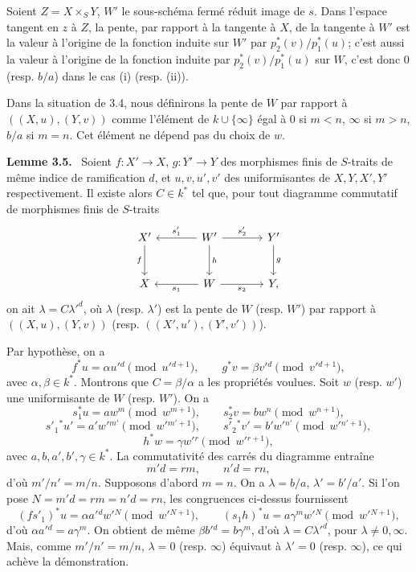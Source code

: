 \documentclass[11pt]{article}
\newenvironment{statement}[1]{\par\medskip\noindent\textbf{#1.}\ }{\par\medskip}
\begin{document}
Soient $Z=X\times_SY$, $W'$ le sous-schéma fermé réduit image de $s$. Dans l'espace tangent en $z$ à $Z$, la pente, par rapport à la tangente à $X$, de la tangente à $W'$ est la valeur à l'origine de la fonction induite sur $W'$ par $p_2^*(v)/p_1^*(u)$; c'est aussi la valeur à l'origine de la fonction induite par $p_2^*(v)/p_1^*(u)$ sur $W$, c'est donc $0$ (resp. $b/a$) dans le cas (i) (resp. (ii)).

Dans la situation de 3.4, nous définirons la pente de $W$ par rapport à $((X,u),(Y,v))$ comme l'élément de $k\cup\{\infty\}$ égal à $0$ si $m<n$, $\infty$ si $m>n$, $b/a$ si $m=n$. Cet élément ne dépend pas du choix de $w$.

\begin{statement}{Lemme 3.5}
Soient $f:X'\to X$, $g:Y'\to Y$ des morphismes finis de $S$-traits de même indice de ramification $d$, et $u,v,u',v'$ des uniformisantes de $X,Y,X',Y'$ respectivement. Il existe alors $C\in k^*$ tel que, pour tout diagramme commutatif de morphismes finis de $S$-traits
\[
\begin{tikzcd}[column sep=large,row sep=large]
X' \arrow[d,"f"'] & W' \arrow[l,"s'_1"'] \arrow[r,"s'_2"] \arrow[d,"h"] & Y' \arrow[d,"g"]\\
X & W \arrow[l,"s_1"] \arrow[r,"s_2"'] & Y ,
\end{tikzcd}
\]
on ait $\lambda=C{\lambda'}^d$, où $\lambda$ (resp. $\lambda'$) est la pente de $W$ (resp. $W'$) par rapport à $((X,u),(Y,v))$ (resp. $((X',u'),(Y',v'))$).
\end{statement}

Par hypothèse, on a
\[
f^*u=\alpha u'{}^d\pmod {u'{}^{d+1}},\qquad
g^*v=\beta v'{}^d\pmod {v'{}^{d+1}},
\]
avec $\alpha,\beta\in k^*$. Montrons que $C=\beta/\alpha$ a les propriétés voulues. Soit $w$ (resp. $w'$) une uniformisante de $W$ (resp. $W'$). On a
\[
s_1^*u=aw^m\pmod {w^{m+1}},\qquad
s_2^*v=bw^n\pmod {w^{n+1}},
\]
\[
s'_1{}^*u'=a'w'{}^{m'}\pmod {w'{}^{m'+1}},\qquad
s'_2{}^*v'=b'w'{}^{n'}\pmod {w'{}^{n'+1}},
\]
\[
h^*w=\gamma w'{}^r\pmod {w'{}^{r+1}},
\]
avec $a,b,a',b',\gamma\in k^*$. La commutativité des carrés du diagramme entraîne
\[
m'd=rm,\qquad n'd=rn,
\]
d'où $m'/n'=m/n$. Supposons d'abord $m=n$. On a $\lambda=b/a$, $\lambda'=b'/a'$. Si l'on pose $N=m'd=rm=n'd=rn$, les congruences ci-dessus fournissent
\[
(fs'_1)^*u=\alpha a'{}^d w'{}^N\pmod {w'{}^{N+1}},\qquad
(s_1h)^*u=a\gamma^m w'{}^N\pmod {w'{}^{N+1}},
\]
d'où $\alpha a'{}^d=a\gamma^m$. On obtient de même $\beta b'{}^d=b\gamma^m$, d'où $\lambda=C{\lambda'}^d$, pour $\lambda\ne 0,\infty$. Mais, comme $m'/n'=m/n$, $\lambda=0$ (resp. $\infty$) équivaut à $\lambda'=0$ (resp. $\infty$), ce qui achève la démonstration.
\end{document}
